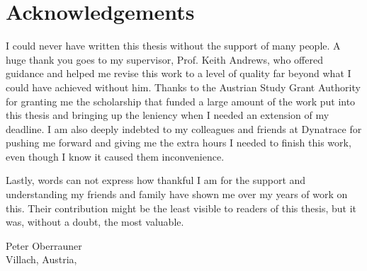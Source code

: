 \chapter*{Acknowledgements}

I could never have written this thesis without the support of many
people. A huge thank you goes to my supervisor, Prof. Keith Andrews,
who offered guidance and helped me revise this work to a level of
quality far beyond what I could have achieved without him. Thanks to
the Austrian Study Grant Authority for granting me the scholarship
that funded a large amount of the work put into this thesis and
bringing up the leniency when I needed an extension of my deadline. I
am also deeply indebted to my colleagues and friends at Dynatrace for
pushing me forward and giving me the extra hours I needed to finish
this work, even though I know it caused them inconvenience. 

Lastly, words can not express how thankful I am for the support and
understanding my friends and family have shown me over my years of
work on this. Their contribution might be the least visible to readers
of this thesis, but it was, without a doubt, the most valuable.


\vspace{2cm}


\begin{flushright}
    Peter Oberrauner \\ {\small Villach, Austria, \thisdate}
\end{flushright}